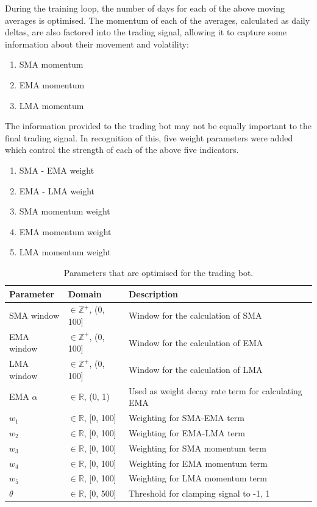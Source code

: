 \documentclass[a4paper, 12pt]{extarticle}
\begin{document}
During the training loop, the number of days for each of the above moving averages is optimised. The momentum of each of the averages, calculated as daily deltas, are also factored into the trading signal, allowing it to capture some information about their movement and volatility: 

\begin{enumerate}[start=3]
    \item SMA momentum 
    \item EMA momentum 
    \item LMA momentum 
\end{enumerate}

\newpage
The information provided to the trading bot may not be equally important to the final trading signal. In recognition of this, five weight parameters were added which control the strength of each of the above five indicators. 

\begin{enumerate}[start=6]
    \item SMA - EMA weight 
    \item EMA - LMA weight 
    \item SMA momentum weight 
    \item EMA momentum weight 
    \item LMA momentum weight 
\end{enumerate}

\begin{table}[H]
    \centering
    \begin{tabularx}{\textwidth}{X X X}
      \toprule
      \textbf{Parameter} & \textbf{Domain} & \textbf{Description} \\
      \midrule
      SMA window        & $\in \mathbb{Z}^+$, (0, 100]  & Window for the calculation of SMA \\
      EMA window        & $\in \mathbb{Z}^+$, (0, 100]  & Window for the calculation of EMA   \\
      LMA window        & $\in \mathbb{Z}^+$, (0, 100]  & Window for the calculation of LMA   \\
      EMA $\alpha$      & $\in \mathbb{R}$, (0, 1)  & Used as weight decay rate term for calculating EMA\\
      $w_1$             & $\in \mathbb{R}$, [0, 100]  & Weighting for SMA-EMA term \\
      $w_2$             & $\in \mathbb{R}$, [0, 100]  & Weighting for EMA-LMA term  \\
      $w_3$             & $\in \mathbb{R}$, [0, 100]  & Weighting for SMA momentum term \\
      $w_4$             & $\in \mathbb{R}$, [0, 100]  & Weighting for EMA momentum term\\
      $w_5$             & $\in \mathbb{R}$, [0, 100]  & Weighting for LMA momentum term \\
      $\theta$          & $\in \mathbb{R}$, [0, 500]  & Threshold for clamping signal to {-1, 1}  \\
      \bottomrule
    \end{tabularx}
    \caption{Parameters that are optimised for the trading bot.}
    \label{tab:parameters}
  \end{table}
\end{document}
